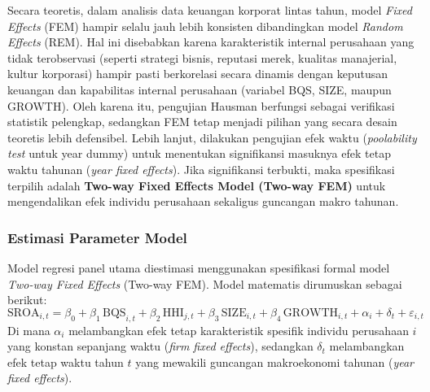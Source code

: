 \documentclass[12pt,a4paper]{article}
\begin{document}
Secara teoretis, dalam analisis data keuangan korporat lintas tahun,
model \emph{Fixed Effects} (FEM) hampir selalu jauh lebih konsisten
dibandingkan model \emph{Random Effects} (REM). Hal ini disebabkan
karena karakteristik internal perusahaan yang tidak terobservasi
(seperti strategi bisnis, reputasi merek, kualitas manajerial, kultur
korporasi) hampir pasti berkorelasi secara dinamis dengan keputusan
keuangan dan kapabilitas internal perusahaan (variabel BQS, SIZE, maupun
GROWTH). Oleh karena itu, pengujian Hausman berfungsi sebagai verifikasi
statistik pelengkap, sedangkan FEM tetap menjadi pilihan yang secara
desain teoretis lebih defensibel. Lebih lanjut, dilakukan pengujian efek
waktu (\emph{poolability test} untuk year dummy) untuk menentukan
signifikansi masuknya efek tetap waktu tahunan (\emph{year fixed
effects}). Jika signifikansi terbukti, maka spesifikasi terpilih adalah
\textbf{Two-way Fixed Effects Model (Two-way FEM)} untuk mengendalikan
efek individu perusahaan sekaligus guncangan makro tahunan.

\subsubsection{Estimasi Parameter Model}\label{estimasi-parameter-model}

Model regresi panel utama diestimasi menggunakan spesifikasi formal
model \emph{Two-way Fixed Effects} (Two-way FEM). Model matematis
dirumuskan sebagai berikut: \begin{equation}
\mathrm{SROA}_{i,t} = \beta_0 + \beta_1\,\mathrm{BQS}_{i,t} + \beta_2\,\mathrm{HHI}_{j,t} + \beta_3\,\mathrm{SIZE}_{i,t} + \beta_4\,\mathrm{GROWTH}_{i,t} + \alpha_i + \delta_t + \varepsilon_{i,t}
\end{equation} Di mana \(\alpha_i\) melambangkan efek tetap
karakteristik spesifik individu perusahaan \(i\) yang konstan sepanjang
waktu (\emph{firm fixed effects}), sedangkan \(\delta_t\) melambangkan
efek tetap waktu tahun \(t\) yang mewakili guncangan makroekonomi
tahunan (\emph{year fixed effects}).
\end{document}
